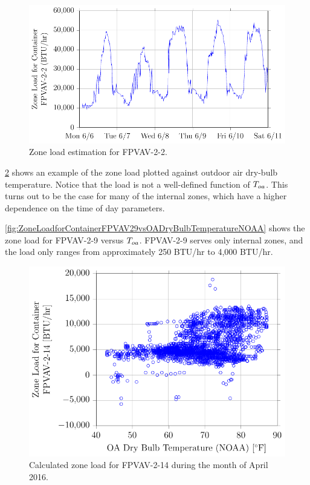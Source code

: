 \begin{figure}
\centering
\includegraphics[]{Plots/2016-06-22-1643-ZoneLoadforContainerFPVAV22-TikzData.pdf}
\caption{Zone load estimation for FPVAV-2-2.}
\label{fig:2016-06-22-1643-ZoneLoadforContainerFPVAV22-TikzData}
\end{figure}



\figref{}
\ref{fig:ZoneLoadforContainerFPVAV214vsOADryBulbTemperatureNOAA} shows
an example of the zone load plotted against outdoor air dry-bulb
temperature. Notice that the load is not a well-defined function of
\(T_{oa}\). This turns out to be the case for many of the internal zones,
which have a higher dependence on the time of day parameters. 

\figref{}
\ref{fig:ZoneLoadforContainerFPVAV29vsOADryBulbTemperatureNOAA} shows
the zone load for FPVAV-2-9 versus \(T_{oa}\). FPVAV-2-9 serves only
internal zones, and the load only ranges from approximately 250 BTU/hr
to 4,000 BTU/hr.


\begin{figure}
\centering
\includegraphics[]{Plots/2016-06-22-1704-ZoneLoadforContainerFPVAV214vsOADryBulbTemperatureNOAA.pdf}
\caption{Calculated zone load for FPVAV-2-14 during the month of April 2016.}
\label{fig:ZoneLoadforContainerFPVAV214vsOADryBulbTemperatureNOAA}
\end{figure}



